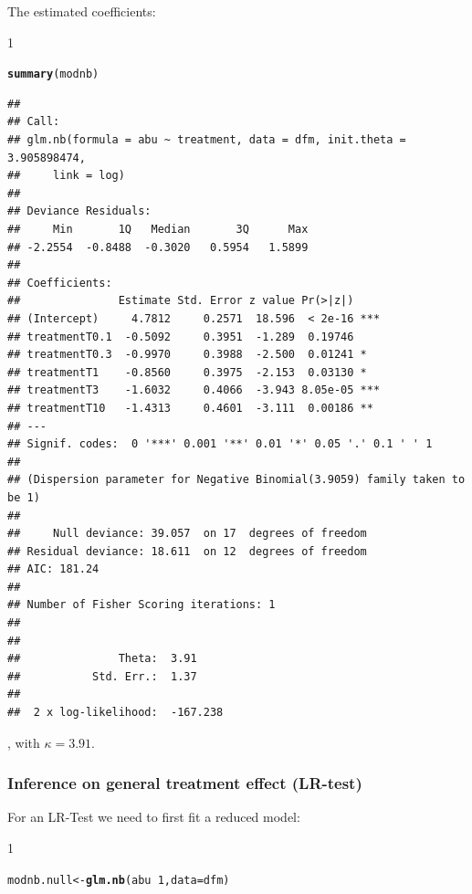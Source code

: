 \documentclass{scrartcl}\usepackage[]{graphicx}\usepackage[]{color}
\makeatletter
\newcommand{\hlnum}[1]{\textcolor[rgb]{0.686,0.059,0.569}{#1}}%
\newcommand{\hlopt}[1]{\textcolor[rgb]{0,0,0}{#1}}%
\newcommand{\hlstd}[1]{\textcolor[rgb]{0.345,0.345,0.345}{#1}}%
\newcommand{\hlkwb}[1]{\textcolor[rgb]{0.69,0.353,0.396}{#1}}%
\newcommand{\hlkwc}[1]{\textcolor[rgb]{0.333,0.667,0.333}{#1}}%
\newcommand{\hlkwd}[1]{\textcolor[rgb]{0.737,0.353,0.396}{\textbf{#1}}}%
\newenvironment{kframe}{%
 \def\at@end@of@kframe{}%
 \ifinner\ifhmode%
  \def\at@end@of@kframe{\end{minipage}}%
  \begin{minipage}{\columnwidth}%
 \fi\fi%
 \def\FrameCommand##1{\hskip\@totalleftmargin \hskip-\fboxsep
 \colorbox{shadecolor}{##1}\hskip-\fboxsep
     \hskip-\linewidth \hskip-\@totalleftmargin \hskip\columnwidth}%
 \MakeFramed {\advance\hsize-\width
   \@totalleftmargin\z@ \linewidth\hsize
   \@setminipage}}%
 {\par\unskip\endMakeFramed%
 \at@end@of@kframe}
\newenvironment{knitrout}{}{} %
\renewenvironment{knitrout}{\begin{spacing}{1}}{\end{spacing}}
\makeatother
\begin{document}
The estimated coefficients:
\begin{knitrout}
\color{fgcolor}\begin{kframe}
\begin{alltt}
\hlkwd{summary}\hlstd{(modnb)}
\end{alltt}
\begin{verbatim}
## 
## Call:
## glm.nb(formula = abu ~ treatment, data = dfm, init.theta = 3.905898474, 
##     link = log)
## 
## Deviance Residuals: 
##     Min       1Q   Median       3Q      Max  
## -2.2554  -0.8488  -0.3020   0.5954   1.5899  
## 
## Coefficients:
##               Estimate Std. Error z value Pr(>|z|)    
## (Intercept)     4.7812     0.2571  18.596  < 2e-16 ***
## treatmentT0.1  -0.5092     0.3951  -1.289  0.19746    
## treatmentT0.3  -0.9970     0.3988  -2.500  0.01241 *  
## treatmentT1    -0.8560     0.3975  -2.153  0.03130 *  
## treatmentT3    -1.6032     0.4066  -3.943 8.05e-05 ***
## treatmentT10   -1.4313     0.4601  -3.111  0.00186 ** 
## ---
## Signif. codes:  0 '***' 0.001 '**' 0.01 '*' 0.05 '.' 0.1 ' ' 1
## 
## (Dispersion parameter for Negative Binomial(3.9059) family taken to be 1)
## 
##     Null deviance: 39.057  on 17  degrees of freedom
## Residual deviance: 18.611  on 12  degrees of freedom
## AIC: 181.24
## 
## Number of Fisher Scoring iterations: 1
## 
## 
##               Theta:  3.91 
##           Std. Err.:  1.37 
## 
##  2 x log-likelihood:  -167.238
\end{verbatim}
\end{kframe}
\end{knitrout}
, with $\kappa = 3.91$.


\subsubsection{Inference on general treatment effect (LR-test)}
For an LR-Test we need to first fit a reduced model:
\begin{knitrout}
\color{fgcolor}\begin{kframe}
\begin{alltt}
\hlstd{modnb.null} \hlkwb{<-} \hlkwd{glm.nb}\hlstd{(abu} \hlopt{~} \hlnum{1}\hlstd{,} \hlkwc{data} \hlstd{= dfm)}
\end{alltt}
\end{kframe}
\end{knitrout}
\end{document}
